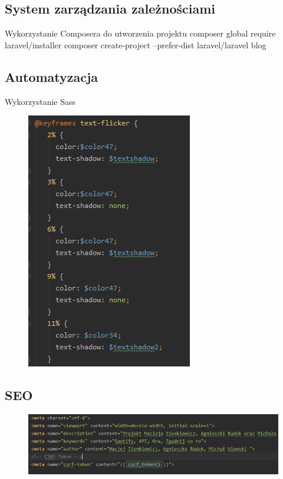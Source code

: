 \documentclass[11pt,a4paper]{article}
\begin{document}
\subsection{\textbf{System zarządzania zależnościami}}
Wykorzystanie Composera do utworzenia projektu
\newline
composer global require laravel/installer
\newline
composer create-project --prefer-dist laravel/laravel blog
\subsection{\textbf{Automatyzacja}}
Wykorzystanie Sass
\begin{figure} [h]
\centering
\includegraphics [keepaspectratio, scale=0.9] {1.13.png}
\end{figure}
\subsection{\textbf{SEO}}
\begin{figure} [h]
\centering
\includegraphics [keepaspectratio, scale=0.9] {1.14.png}
\end{figure}
\newpage
\end{document}
